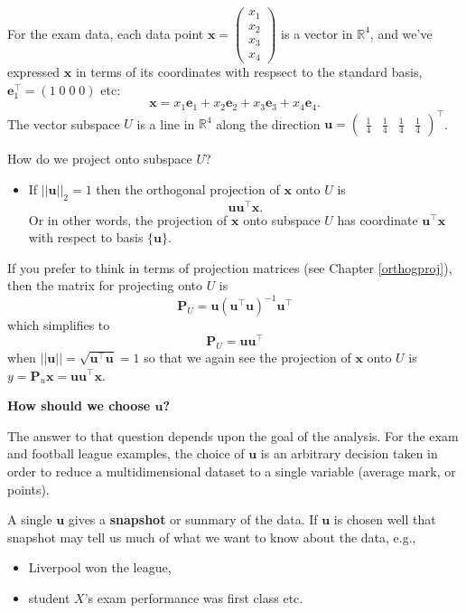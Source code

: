 \documentclass[]{book}
\providecommand{\tightlist}{%
  \setlength{\itemsep}{0pt}\setlength{\parskip}{0pt}}
\theoremstyle{definition}
\theoremstyle{definition}
\theoremstyle{definition}
\theoremstyle{remark}
\begin{document}
For the exam data, each data point \(\mathbf x= \begin{pmatrix} x_1 \\ x_2 \\ x_3 \\ x_4 \end{pmatrix}\)
is a vector in \(\mathbb{R}^4\), and we've expressed \(\mathbf x\) in terms of its coordinates with respsect to the standard basis, \(\mathbf e_1^\top = (1\; 0\; 0 \; 0)\) etc:
\[\mathbf x=x_1 \mathbf e_1 + x_2 \mathbf e_2 +x_3 \mathbf e_3 +x_4 \mathbf e_4.\]
The vector subspace \(U\) is a line in \(\mathbb{R}^4\) along the direction \(\mathbf u= \begin{pmatrix} \frac{1}{4} & \frac{1}{4} & \frac{1}{4} & \frac{1}{4} \end{pmatrix}^\top\).

How do we project onto subspace \(U\)?

\begin{itemize}
\tightlist
\item
  If \(||\mathbf u||_2=1\) then the orthogonal projection of \(\mathbf x\) onto \(U\) is\\
  \[\mathbf u\mathbf u^\top\mathbf x.\]
  Or in other words, the projection of \(\mathbf x\) onto subspace \(U\) has coordinate \(\mathbf u^\top \mathbf x\) with respect to basis \(\{\mathbf u\}\).
\end{itemize}

If you prefer to think in terms of projection matrices (see Chapter \ref{orthogproj}), then the matrix for projecting onto \(U\) is
\[\mathbf P_U = \mathbf u(\mathbf u^\top \mathbf u)^{-1}\mathbf u^\top\]
which simplifies to
\[\mathbf P_U = \mathbf u\mathbf u^\top\]
when \(||\mathbf u||=\sqrt{\mathbf u^\top\mathbf u}=1\) so that we again see the projection of \(\mathbf x\) onto \(U\) is \(y=\mathbf P_u \mathbf x= \mathbf u\mathbf u^\top\mathbf x\).

\textbf{How should we choose \(\mathbf u\)?}

The answer to that question depends upon the goal of the analysis. For the exam and football league examples, the choice of \(\mathbf u\) is an arbitrary decision taken in order to reduce a multidimensional dataset to a single variable (average mark, or points).

A single \(\mathbf u\) gives a \textbf{snapshot} or summary of the data. If \(\mathbf u\) is chosen well that snapshot may tell us much of what we want to know about the data, e.g.,

\begin{itemize}
\tightlist
\item
  Liverpool won the league,
\item
  student \(X\)'s exam performance was first class etc.
\end{itemize}
\end{document}
